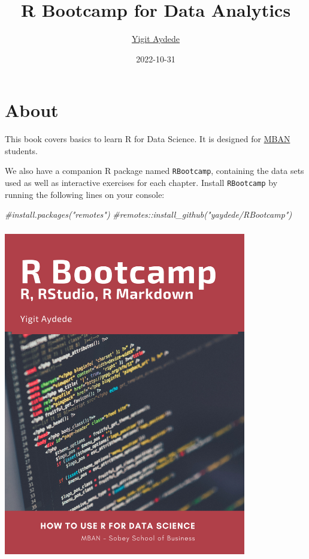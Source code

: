 \documentclass[
]{book}
\title{R Bootcamp for Data Analytics}
\author{\href{https://yaydede.github.io/}{Yigit Aydede}}
\date{2022-10-31}
\newenvironment{Shaded}{\begin{snugshade}}{\end{snugshade}}
\newcommand{\CommentTok}[1]{\textcolor[rgb]{0.56,0.35,0.01}{\textit{#1}}}
\begin{document}
\maketitle

{
\hypersetup{linkcolor=}
\setcounter{tocdepth}{1}
\tableofcontents
}
\hypertarget{about}{%
\chapter*{About}\label{about}}

This book covers basics to learn R for Data Science. It is designed for \href{https://www.smu.ca/mban/index.html}{MBAN} students.

We also have a companion R package named \texttt{RBootcamp}, containing the data sets used as well as interactive exercises for each chapter. Install \texttt{RBootcamp} by running the following lines on your console:

\begin{Shaded}
\begin{Highlighting}[]
\CommentTok{\#install.packages("remotes")}
\CommentTok{\#remotes::install\_github("yaydede/RBootcamp")}
\end{Highlighting}
\end{Shaded}

\includegraphics[width=4.16667in,height=5.72917in]{png/cover2.png}
\end{document}
